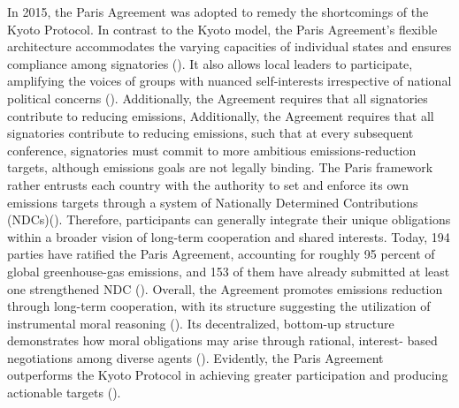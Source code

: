 In 2015, the Paris Agreement was adopted to remedy the shortcomings of the Kyoto Protocol. In contrast to the Kyoto model, the Paris Agreement’s flexible architecture accommodates the varying capacities of individual states and ensures compliance among signatories (\cite[p.\ 150]{moehler2020climate}). It also allows local leaders to participate, amplifying the voices of groups with nuanced self-interests irrespective of national political concerns (\cites{broto2022}[p.\ 67]{skjaersethetal2021}[p.\ 151]{moehler2020climate}). Additionally, the Agreement requires that all signatories contribute to reducing emissions, Additionally, the Agreement requires that all signatories contribute to reducing emissions, such that at every subsequent conference, signatories must commit to more ambitious emissions-reduction targets, although emissions goals are not legally binding. The Paris framework rather entrusts each country with the authority to set and enforce its own emissions targets through a system of Nationally Determined Contributions (NDCs)(\cite[pp.\ 9–10]{maslin-nodate}). Therefore, participants can generally integrate their unique obligations within a broader vision of long-term cooperation and shared interests. Today, 194 parties have ratified the Paris Agreement, accounting for roughly 95 percent of global greenhouse-gas emissions, and 153 of them have already submitted at least one strengthened NDC (\cite{unfccc2024ndc}). Overall, the Agreement promotes emissions reduction through long-term cooperation, with its structure suggesting the utilization of instrumental moral reasoning (\cites[pp.\ 5–6]{maslin-nodate}[p.\ 140]{moehler2020climate}{unitednationsclimate2025}). Its decentralized, bottom-up structure demonstrates how moral obligations may arise through rational, interest- based negotiations among diverse agents (\cite{skjaersethetal2021}). Evidently, the Paris Agreement outperforms the Kyoto Protocol in achieving greater participation and producing actionable targets (\cites{zeyrek2021}{tachibana2017}{green2024}).

